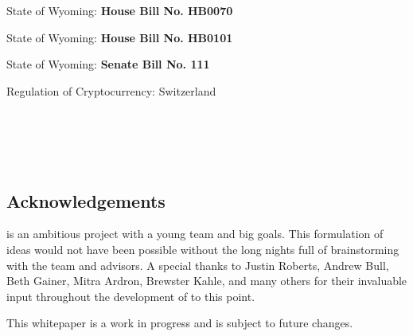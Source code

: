 \documentclass{kwp-builder}
\begin{document}
\begin{thebibliography}{9}
State of Wyoming: \textbf{House Bill No. HB0070}
\\\texttt{}

State of Wyoming: \textbf{House Bill No. HB0101}
\\\texttt{}

State of Wyoming: \textbf{Senate Bill No. 111}
\\\texttt{}
 
Regulation of Cryptocurrency: Switzerland
\\\texttt{}

\cardano
\\\texttt{}

\ipfs
\\\texttt{ }
\end{thebibliography}

\subsection{Acknowledgements}

\tab \konjure is an ambitious project with a young team and big goals. This formulation of ideas would not have been possible without the long nights full of brainstorming with the \konjure team and advisors. A special thanks to Justin Roberts, Andrew Bull, Beth Gainer, Mitra Ardron, Brewster Kahle, and many others for their invaluable input throughout the development of \konjure to this point.\bigskip

This whitepaper is a work in progress and is subject to future changes.
\end{document}

